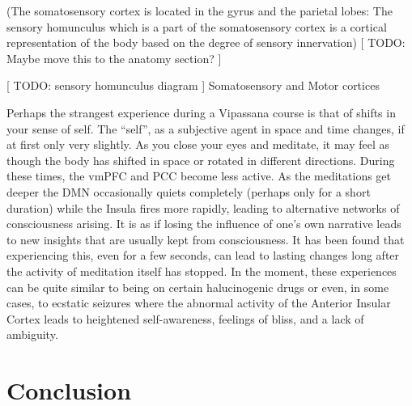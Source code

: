 \documentclass[twocolumn]{article}
\begin{document}
(The somatosensory cortex is located in the gyrus and the parietal lobes: The sensory
homunculus which is a part of the somatosensory cortex is a cortical representation
of the body based on the degree of sensory innervation) [ TODO: Maybe move this to
  the anatomy section? ]

[ TODO: sensory homunculus diagram ]
Somatosensory and Motor cortices

Perhaps the strangest experience during a Vipassana course is that of shifts in your
sense of self. The ``self'', as a subjective agent in space and time changes, if at
first only very slightly. As you close your eyes and meditate, it may feel as though
the body has shifted in space or rotated in different directions. During these times,
the vmPFC and PCC become less active. As the meditations get deeper the DMN
occasionally quiets completely (perhaps only for a short duration) while the Insula
fires more rapidly, leading to alternative networks of consciousness arising. It is
as if losing the influence of one's own narrative leads to new insights that are
usually kept from consciousness. It has been found that experiencing this, even for a
few seconds, can lead to lasting changes long after the activity of meditation itself
has stopped. \cite{alteredtraits} In the moment, these experiences can be quite
similar to being on certain halucinogenic drugs or even, in some cases, to ecstatic
seizures where the abnormal activity of the Anterior Insular Cortex leads to
heightened self-awareness, feelings of bliss, and a lack of ambiguity. \cite{cortexbliss}

\section{Conclusion}
\end{document}
